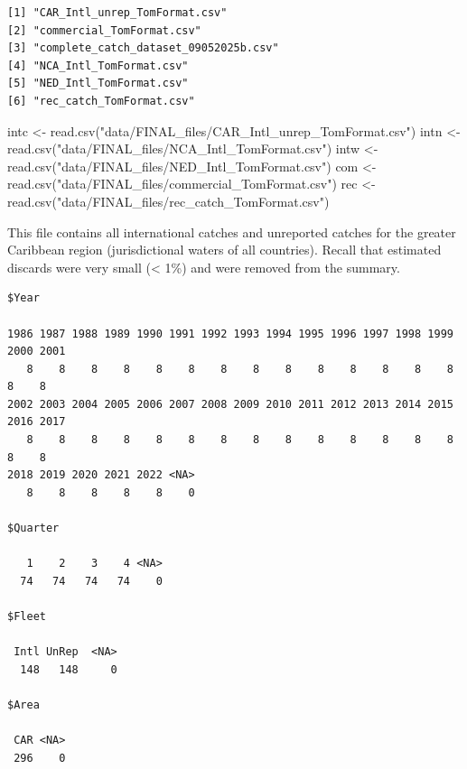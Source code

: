 \documentclass[
  letterpaper,
  oneside,
  open=any]{scrbook}
\newenvironment{Shaded}{\begin{snugshade}}{\end{snugshade}}
\newcommand{\FunctionTok}[1]{\textcolor[rgb]{0.28,0.35,0.67}{#1}}
\newcommand{\NormalTok}[1]{\textcolor[rgb]{0.00,0.23,0.31}{#1}}
\newcommand{\OtherTok}[1]{\textcolor[rgb]{0.00,0.23,0.31}{#1}}
\newcommand{\StringTok}[1]{\textcolor[rgb]{0.13,0.47,0.30}{#1}}
\begin{document}
\begin{verbatim}
[1] "CAR_Intl_unrep_TomFormat.csv"        
[2] "commercial_TomFormat.csv"            
[3] "complete_catch_dataset_09052025b.csv"
[4] "NCA_Intl_TomFormat.csv"              
[5] "NED_Intl_TomFormat.csv"              
[6] "rec_catch_TomFormat.csv"             
\end{verbatim}

\begin{Shaded}
\begin{Highlighting}[]
\NormalTok{intc }\OtherTok{\textless{}{-}} \FunctionTok{read.csv}\NormalTok{(}\StringTok{"data/FINAL\_files/CAR\_Intl\_unrep\_TomFormat.csv"}\NormalTok{)}
\NormalTok{intn }\OtherTok{\textless{}{-}} \FunctionTok{read.csv}\NormalTok{(}\StringTok{"data/FINAL\_files/NCA\_Intl\_TomFormat.csv"}\NormalTok{)}
\NormalTok{intw }\OtherTok{\textless{}{-}} \FunctionTok{read.csv}\NormalTok{(}\StringTok{"data/FINAL\_files/NED\_Intl\_TomFormat.csv"}\NormalTok{)}
\NormalTok{com }\OtherTok{\textless{}{-}} \FunctionTok{read.csv}\NormalTok{(}\StringTok{"data/FINAL\_files/commercial\_TomFormat.csv"}\NormalTok{)}
\NormalTok{rec }\OtherTok{\textless{}{-}} \FunctionTok{read.csv}\NormalTok{(}\StringTok{"data/FINAL\_files/rec\_catch\_TomFormat.csv"}\NormalTok{)}
\end{Highlighting}
\end{Shaded}

This file contains all international catches and unreported catches for
the greater Caribbean region (jurisdictional waters of all countries).
Recall that estimated discards were very small (\textless{} 1\%) and
were removed from the summary.

\begin{verbatim}
$Year

1986 1987 1988 1989 1990 1991 1992 1993 1994 1995 1996 1997 1998 1999 2000 2001 
   8    8    8    8    8    8    8    8    8    8    8    8    8    8    8    8 
2002 2003 2004 2005 2006 2007 2008 2009 2010 2011 2012 2013 2014 2015 2016 2017 
   8    8    8    8    8    8    8    8    8    8    8    8    8    8    8    8 
2018 2019 2020 2021 2022 <NA> 
   8    8    8    8    8    0 

$Quarter

   1    2    3    4 <NA> 
  74   74   74   74    0 

$Fleet

 Intl UnRep  <NA> 
  148   148     0 

$Area

 CAR <NA> 
 296    0 
\end{verbatim}
\end{document}
